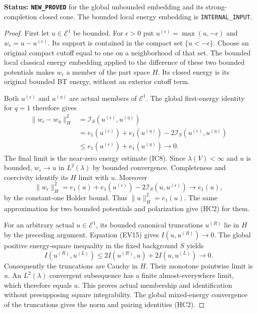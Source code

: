 \documentclass[11pt,a4paper]{article}
\numberwithin{equation}{section}
\theoremstyle{definition}
\theoremstyle{remark}
\begin{document}
\noindent\textbf{Status: \texttt{NEW\_PROVED}} for the global
unbounded embedding and its strong-completion closed cone.
The bounded local energy embedding is \texttt{INTERNAL\_INPUT}.

\begin{proof}
First let $u\in\mathcal E^1$ be bounded. For $\epsilon>0$
put $u^{(\epsilon)}=\max(u,-\epsilon)$ and
$w_\epsilon=u-u^{(\epsilon)}$. Its support is contained in
the compact set $\overline{\{u<-\epsilon\}}$.
Choose an original compact cutoff equal to one on a
neighborhood of that set. The bounded local classical
energy embedding applied to the difference of these two
bounded potentials makes $w_\epsilon$ a member of the part
space $H$. Its closed energy is its original bounded BT
energy, without an exterior cutoff term.

Both $u^{(\epsilon)}$ and $u^{(\eta)}$ are actual members
of $\mathcal E^1$. The global first-energy identity for
$q=1$ therefore gives
\[
 \begin{split}
 \|w_\epsilon-w_\eta\|_H^2
   &=\mathscr I_S(u^{(\epsilon)},u^{(\eta)})\\
   &=e_1(u^{(\epsilon)})+e_1(u^{(\eta)})
           -2\mathcal I_S(u^{(\epsilon)},u^{(\eta)})\\
   &\leq e_1(u^{(\epsilon)})+e_1(u^{(\eta)})\longrightarrow0.
 \end{split}
 \tag{HC5}
\]
The final limit is the near-zero energy estimate (IC8).
Since $\lambda(V)<\infty$ and $u$ is bounded,
$w_\epsilon\to u$ in $L^2(\lambda)$ by bounded convergence.
Completeness and coercivity identify its $H$ limit with $u$.
Moreover
\[
 \|w_\epsilon\|_H^2
   =e_1(u)+e_1(u^{(\epsilon)})
                   -2\mathcal I_S(u,u^{(\epsilon)})
                         \longrightarrow e_1(u),
 \tag{HC6}
\]
by the constant-one Holder bound. Thus $\|u\|_H^2=e_1(u)$.
The same approximation for two bounded potentials and
polarization give (HC2) for them.

For an arbitrary actual $u\in\mathcal E^1$, its bounded
canonical truncations $u^{(R)}$ lie in $H$ by the preceding
argument. Equation (EV15) gives
$I(u,u^{(R)})\to0$. The global positive energy-square
inequality in the fixed background $S$ yields
\[
 I(u^{(R)},u^{(L)})
                  \leq2I(u^{(R)},u)+2I(u,u^{(L)})\longrightarrow0.
 \tag{HC7}
\]
Consequently the truncations are Cauchy in $H$.
Their monotone pointwise limit is $u$. An $L^2(\lambda)$
convergent subsequence has a finite almost-everywhere limit,
which therefore equals $u$. This proves actual membership
and identification without presupposing square integrability.
The global mixed-energy convergence of the truncations gives
the norm and pairing identities (HC2).


\end{proof}
\end{document}
